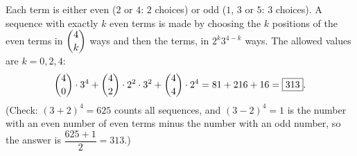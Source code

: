 Each term is either even ($2$ or $4$: $2$ choices) or odd ($1$, $3$ or $5$: $3$ choices). A sequence with exactly $k$ even terms is made by choosing the $k$ positions of the even terms in $\dbinom4k$ ways and then the terms, in $2^k3^{4-k}$ ways. The allowed values are $k=0,2,4$:
\[\dbinom40\cdot3^4+\dbinom42\cdot2^2\cdot3^2+\dbinom44\cdot2^4=81+216+16=\boxed{313}.\]
(Check: $(3+2)^4=625$ counts all sequences, and $(3-2)^4=1$ is the number with an even number of even terms minus the number with an odd number, so the answer is $\dfrac{625+1}{2}=313$.)
